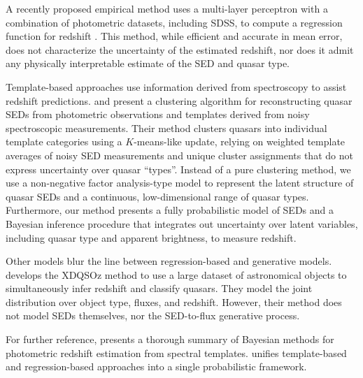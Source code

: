 \documentclass{article} %
\begin{document}
A recently proposed empirical method uses a multi-layer perceptron with a combination of photometric datasets, including SDSS, 
to compute a regression function for redshift \cite{brescia2013photometric}. 
This method, while efficient and accurate in mean error, does not characterize the uncertainty of the estimated redshift, nor does it admit any physically interpretable estimate of the SED and quasar type.  

Template-based approaches use information derived from spectroscopy to assist redshift predictions.  
\cite{budavari2001photometric} and \cite{richards2001photometric} present a clustering algorithm for reconstructing quasar SEDs from photometric observations and templates derived from noisy spectroscopic measurements.  
Their method clusters quasars into individual template categories using a $K$-means-like update, relying on weighted template averages of noisy SED measurements and unique cluster assignments that do not express uncertainty over quasar ``types''. 
Instead of a pure clustering method, we use a non-negative factor analysis-type model to represent the latent structure of quasar SEDs and a continuous, low-dimensional range of quasar types.  
Furthermore, our method presents a fully probabilistic model of SEDs and a Bayesian inference procedure that integrates out uncertainty over latent variables, including quasar type and apparent brightness, to measure redshift.    

Other models blur the line between regression-based and generative models. \cite{bovy2012photometric} develops the XDQSOz method to use a large dataset of astronomical objects to simultaneously infer redshift and classify quasars.  
They model the joint distribution over object type, fluxes, and redshift.  However, their method does not model SEDs themselves, nor the SED-to-flux generative process. 

For further reference, \cite{benitez2000bayesian} presents a thorough summary of Bayesian methods for photometric redshift estimation from spectral templates.  \cite{budavari2009unified} unifies template-based and regression-based approaches into a single probabilistic framework. 
\end{document}
